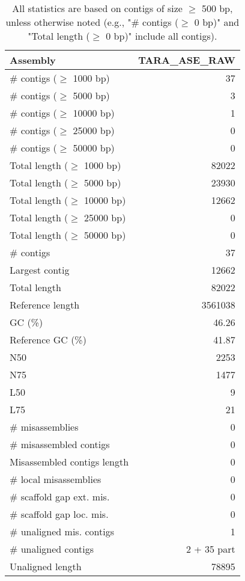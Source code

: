 \documentclass[12pt,a4paper]{article}
\begin{document}
\begin{table}[ht]
\begin{center}
\caption{All statistics are based on contigs of size $\geq$ 500 bp, unless otherwise noted (e.g., "\# contigs ($\geq$ 0 bp)" and "Total length ($\geq$ 0 bp)" include all contigs).}
\begin{tabular}{|l*{1}{|r}|}
\hline
Assembly & TARA\_ASE\_RAW \\ \hline
\# contigs ($\geq$ 1000 bp) & 37 \\ \hline
\# contigs ($\geq$ 5000 bp) & 3 \\ \hline
\# contigs ($\geq$ 10000 bp) & 1 \\ \hline
\# contigs ($\geq$ 25000 bp) & 0 \\ \hline
\# contigs ($\geq$ 50000 bp) & 0 \\ \hline
Total length ($\geq$ 1000 bp) & 82022 \\ \hline
Total length ($\geq$ 5000 bp) & 23930 \\ \hline
Total length ($\geq$ 10000 bp) & 12662 \\ \hline
Total length ($\geq$ 25000 bp) & 0 \\ \hline
Total length ($\geq$ 50000 bp) & 0 \\ \hline
\# contigs & 37 \\ \hline
Largest contig & 12662 \\ \hline
Total length & 82022 \\ \hline
Reference length & 3561038 \\ \hline
GC (\%) & 46.26 \\ \hline
Reference GC (\%) & 41.87 \\ \hline
N50 & 2253 \\ \hline
N75 & 1477 \\ \hline
L50 & 9 \\ \hline
L75 & 21 \\ \hline
\# misassemblies & 0 \\ \hline
\# misassembled contigs & 0 \\ \hline
Misassembled contigs length & 0 \\ \hline
\# local misassemblies & 0 \\ \hline
\# scaffold gap ext. mis. & 0 \\ \hline
\# scaffold gap loc. mis. & 0 \\ \hline
\# unaligned mis. contigs & 1 \\ \hline
\# unaligned contigs & 2 + 35 part \\ \hline
Unaligned length & 78895 \\ \hline

\end{tabular}
\end{center}
\end{table}
\end{document}
